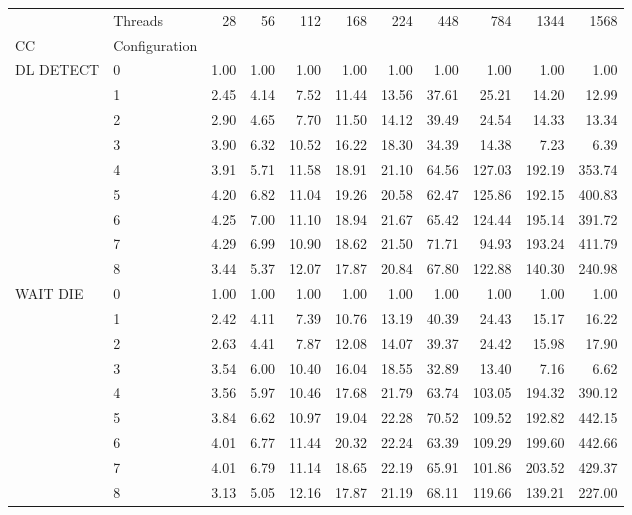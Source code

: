 \begin{tabular}{llrrrrrrrrr}
\toprule
       & Threads &  28   &  56   &  112  &  168  &  224  &   448  &   784  &   1344 &    1568 \\
CC & Configuration &       &       &       &       &       &        &        &        &         \\
\midrule
DL DETECT & 0 &  1.00 &  1.00 &  1.00 &  1.00 &  1.00 &   1.00 &   1.00 &   1.00 &    1.00 \\
       & 1 &  2.45 &  4.14 &  7.52 & 11.44 & 13.56 &  37.61 &  25.21 &  14.20 &   12.99 \\
       & 2 &  2.90 &  4.65 &  7.70 & 11.50 & 14.12 &  39.49 &  24.54 &  14.33 &   13.34 \\
       & 3 &  3.90 &  6.32 & 10.52 & 16.22 & 18.30 &  34.39 &  14.38 &   7.23 &    6.39 \\
       & 4 &  3.91 &  5.71 & 11.58 & 18.91 & 21.10 &  64.56 & 127.03 & 192.19 &  353.74 \\
       & 5 &  4.20 &  6.82 & 11.04 & 19.26 & 20.58 &  62.47 & 125.86 & 192.15 &  400.83 \\
       & 6 &  4.25 &  7.00 & 11.10 & 18.94 & 21.67 &  65.42 & 124.44 & 195.14 &  391.72 \\
       & 7 &  4.29 &  6.99 & 10.90 & 18.62 & 21.50 &  71.71 &  94.93 & 193.24 &  411.79 \\
       & 8 &  3.44 &  5.37 & 12.07 & 17.87 & 20.84 &  67.80 & 122.88 & 140.30 &  240.98 \\
WAIT DIE & 0 &  1.00 &  1.00 &  1.00 &  1.00 &  1.00 &   1.00 &   1.00 &   1.00 &    1.00 \\
       & 1 &  2.42 &  4.11 &  7.39 & 10.76 & 13.19 &  40.39 &  24.43 &  15.17 &   16.22 \\
       & 2 &  2.63 &  4.41 &  7.87 & 12.08 & 14.07 &  39.37 &  24.42 &  15.98 &   17.90 \\
       & 3 &  3.54 &  6.00 & 10.40 & 16.04 & 18.55 &  32.89 &  13.40 &   7.16 &    6.62 \\
       & 4 &  3.56 &  5.97 & 10.46 & 17.68 & 21.79 &  63.74 & 103.05 & 194.32 &  390.12 \\
       & 5 &  3.84 &  6.62 & 10.97 & 19.04 & 22.28 &  70.52 & 109.52 & 192.82 &  442.15 \\
       & 6 &  4.01 &  6.77 & 11.44 & 20.32 & 22.24 &  63.39 & 109.29 & 199.60 &  442.66 \\
       & 7 &  4.01 &  6.79 & 11.14 & 18.65 & 22.19 &  65.91 & 101.86 & 203.52 &  429.37 \\
       & 8 &  3.13 &  5.05 & 12.16 & 17.87 & 21.19 &  68.11 & 119.66 & 139.21 &  227.00 \\

\end{tabular}
